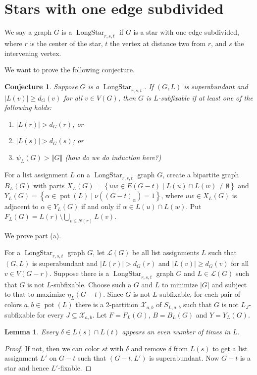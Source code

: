 \documentclass[12pt]{article}
\theoremstyle{plain}
\newtheorem{lem}[thm]{Lemma}
\newtheorem{conjecture}[thm]{Conjecture}
\theoremstyle{definition}
\theoremstyle{remark}
\newcommand{\fancy}[1]{\mathcal{#1}}
\newcommand{\setb}[3]{\left\{ #1 \in #2 \mid #3 \right\}}
\newcommand{\size}[1]{\left\Vert#1\right\Vert}
\newcommand{\pot}{\operatorname{pot}}
\def\X{\fancy{X}}
\def\L{\fancy{L}}
\begin{document}
\section{Stars with one edge subdivided}
	We say a graph $G$ is a $\operatorname{LongStar}_{r,s,t}$ if $G$ is a star with one edge subdivided, where $r$ is the center of the
	star, $t$ the vertex at distance two from $r$, and $s$ the intervening vertex.  
	
	We want to prove the following conjecture.
	
\begin{conjecture}
	\label{StarWithOneEdgeSubdivided}
 	 Suppose $G$ is a $\operatorname{LongStar}_{r,s,t}$. If $(G,L)$ is superabundant and $|L(v)| \ge d_G(v)$ for all 
	 $v \in V(G)$, then $G$ is $L$-subfixable if at least one of the following holds:
	\begin{enumerate}
		\item[(a)] $|L(r)| > d_G(r)$; or
		\item[(b)] $|L(s)| > d_G(s)$; or
		\item[(c)] $\psi_L(G) > \size{G}$ (how do we do induction here?)
	\end{enumerate}
\end{conjecture}

For a list assignment $L$ on a $\operatorname{LongStar}_{r,s,t}$ graph $G$, create a bipartite graph $B_L(G)$ with parts $X_L(G) = \setb{uw}{E(G - t)}{L(u) \cap L(w) \ne \emptyset}$ and $Y_L(G) = \setb{\alpha}{\pot(L)}{\nu((G - t)_\alpha) = 1}$, where $uw \in X_L(G)$ is adjacent to $\alpha \in Y_L(G)$ if and only if $\alpha \in L(u) \cap L(w)$.  Put $F_L(G) = L(r) \setminus \bigcup_{v \in N(r)} L(v)$.

	
	We prove part (a). 
	
	
	For a $\operatorname{LongStar}_{r,s,t}$ graph $G$, let $\L(G)$ be all list assignments $L$ such that $(G,L)$ is superabundant and $|L(r)| > d_G(r)$ and $|L(v)| \ge d_G(v)$ for all $v \in V(G-r)$.  Suppose there is a $\operatorname{LongStar}_{r,s,t}$ graph $G$ and $L \in \L(G)$ such that $G$ is not $L$-subfixable.  Choose such a $G$ and $L$ to minimize $|G|$ and subject to that to maximize $\eta_L(G - t)$.  Since $G$ is not $L$-subfixable, for each pair of colors $a,b \in \pot(L)$ there is a 2-partition $\X_{a,b}$ of $S_{L,a,b}$ such that $G$ is not $L_J$-subfixable for every $J \subseteq \X_{a,b}$.  Let $F = F_L(G)$, $B = B_L(G)$ and $Y = Y_L(G)$.
	
	\begin{lem}\label{ColorsOnSTAreEven}
		Every $\delta \in L(s) \cap L(t)$ appears an even number of times in $L$.
	\end{lem}
	\begin{proof}
		If not, then we can color $st$ with $\delta$ and remove $\delta$ from $L(s)$ to get a list assignment $L'$ on $G-t$ such that $(G-t, L')$ is superabundant.  Now $G-t$ is a star and hence $L'$-fixable.
	\end{proof}
\end{document}
